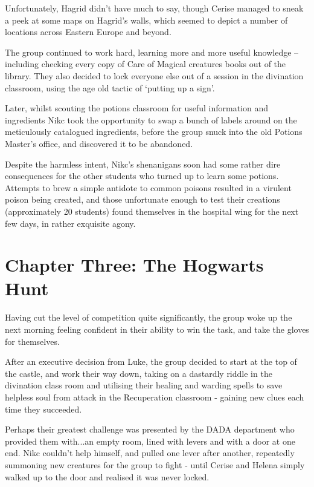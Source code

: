 \documentclass[oneside]{book}
\begin{document}
Unfortunately, Hagrid didn't have much to say, though Cerise managed to sneak a peek at some maps on Hagrid's walls, which seemed to depict a number of locations across Eastern Europe and beyond. 

The group continued to work hard, learning more and more useful knowledge -- including checking every copy of Care of Magical creatures books out of the library. They also decided to lock everyone else out of a session in the divination classroom, using the age old tactic of `putting up a sign'. 

Later, whilst scouting the potions classroom for useful information and ingredients Nikc took the opportunity to swap a bunch of labels around on the meticulously catalogued ingredients, before the group snuck into the old Potions Master's office, and discovered it to be abandoned.

Despite the harmless intent, Nikc's shenanigans soon had some rather dire consequences for the other students who turned up to learn some potions. Attempts to brew a simple antidote to common poisons resulted in a virulent poison being created, and those unfortunate enough to test their creations (approximately 20 students) found themselves in the hospital wing for the next few days, in rather exquisite agony. 

\section{Chapter Three: The Hogwarts Hunt}


Having cut the level of competition quite significantly, the group woke up the next morning feeling confident in their ability to win the task, and take the gloves for themselves. 

After an executive decision from Luke, the group decided to start at the top of the castle, and work their way down, taking on a dastardly riddle in the divination class room and utilising their healing and warding spells to save helpless soul from attack in the Recuperation classroom - gaining new clues each time they succeeded. 

Perhaps their greatest challenge was presented by the DADA department who provided them with...an empty room, lined with levers and with a door at one end. Nikc couldn't help himself, and pulled one lever after another, repeatedly summoning new creatures for the group to fight - until Cerise and Helena simply walked up to the door and realised it was never locked.
\end{document}
